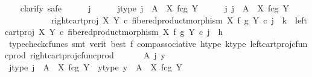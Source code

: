 \begin{isabellebody}
\ \ \isamarkupfalse%
\ {\isacharparenleft}{\kern0pt}clarify{\isacharcomma}{\kern0pt}\ safe{\isacharparenright}{\kern0pt}\isanewline
\ \ \ \ \isamarkupfalse%
\ j\isanewline
\ \ \ \ \isamarkupfalse%
\ j{\isacharunderscore}{\kern0pt}type{\isacharcolon}{\kern0pt}\ {\isachardoublequoteopen}j\ {\isacharcolon}{\kern0pt}\ A\ {\isasymrightarrow}\ X\ \isactrlbsub f\isactrlesub {\isasymtimes}\isactrlsub c\isactrlbsub g\isactrlesub \ Y{\isachardoublequoteclose}\isanewline
\isanewline
\ \ \ \ \isamarkupfalse%
\ {\isachardoublequoteopen}{\isasymexists}j{\isachardot}{\kern0pt}\ j\ {\isacharcolon}{\kern0pt}\ A\ {\isasymrightarrow}\ X\ \isactrlbsub f\isactrlesub {\isasymtimes}\isactrlsub c\isactrlbsub g\isactrlesub \ Y\ {\isasymand}\isanewline
\ \ \ \ \ \ \ \ \ \ \ {\isacharparenleft}{\kern0pt}right{\isacharunderscore}{\kern0pt}cart{\isacharunderscore}{\kern0pt}proj\ X\ Y\ {\isasymcirc}\isactrlsub c\ fibered{\isacharunderscore}{\kern0pt}product{\isacharunderscore}{\kern0pt}morphism\ X\ f\ g\ Y{\isacharparenright}{\kern0pt}\ {\isasymcirc}\isactrlsub c\ j\ {\isacharequal}{\kern0pt}\ k\ {\isasymand}\ {\isacharparenleft}{\kern0pt}left{\isacharunderscore}{\kern0pt}cart{\isacharunderscore}{\kern0pt}proj\ X\ Y\ {\isasymcirc}\isactrlsub c\ fibered{\isacharunderscore}{\kern0pt}product{\isacharunderscore}{\kern0pt}morphism\ X\ f\ g\ Y{\isacharparenright}{\kern0pt}\ {\isasymcirc}\isactrlsub c\ j\ {\isacharequal}{\kern0pt}\ h{\isachardoublequoteclose}\isanewline
\ \ \ \ \ \ \isamarkupfalse%
\ {\isacharparenleft}{\kern0pt}typecheck{\isacharunderscore}{\kern0pt}cfuncs{\isacharcomma}{\kern0pt}\ smt\ {\isacharparenleft}{\kern0pt}verit{\isacharcomma}{\kern0pt}\ best{\isacharparenright}{\kern0pt}\ f{}\ comp{\isacharunderscore}{\kern0pt}associative{}\ h{\isacharunderscore}{\kern0pt}type\ k{\isacharunderscore}{\kern0pt}type\ left{\isacharunderscore}{\kern0pt}cart{\isacharunderscore}{\kern0pt}proj{\isacharunderscore}{\kern0pt}cfunc{\isacharunderscore}{\kern0pt}prod\ right{\isacharunderscore}{\kern0pt}cart{\isacharunderscore}{\kern0pt}proj{\isacharunderscore}{\kern0pt}cfunc{\isacharunderscore}{\kern0pt}prod{\isacharparenright}{\kern0pt}\isanewline
\ \ \isamarkupfalse%
\isanewline
{}\isamarkupfalse%
\isanewline
\ \ \isamarkupfalse%
\ A\ j\ y\isanewline
\ \ \isamarkupfalse%
\ j{\isacharunderscore}{\kern0pt}type{\isacharcolon}{\kern0pt}\ {\isachardoublequoteopen}j\ {\isacharcolon}{\kern0pt}\ A\ {\isasymrightarrow}\ X\ \isactrlbsub f\isactrlesub {\isasymtimes}\isactrlsub c\isactrlbsub g\isactrlesub \ Y{\isachardoublequoteclose}\ \ y{\isacharunderscore}{\kern0pt}type{\isacharcolon}{\kern0pt}\ {\isachardoublequoteopen}y\ {\isacharcolon}{\kern0pt}\ A\ {\isasymrightarrow}\ X\ \isactrlbsub f\isactrlesub {\isasymtimes}\isactrlsub c\isactrlbsub g\isactrlesub \ Y{\isachardoublequoteclose}\isanewline

\end{isabellebody}
